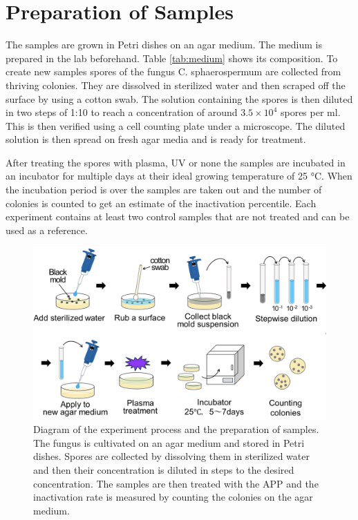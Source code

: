 \section{Preparation of Samples}
The samples are grown in Petri dishes on an agar medium. The medium is prepared in the lab beforehand. Table \ref{tab:medium} shows its composition. To create new samples spores of the fungus C. sphaerospermum are collected from thriving colonies. They are dissolved in sterilized water and then scraped off the surface by using a cotton swab. The solution containing the spores is then diluted in two steps of 1:10 to reach a concentration of around $3.5\times 10^4$ spores per ml. This is then verified using a cell counting plate under a microscope. The diluted solution is then spread on fresh agar media and is ready for treatment.

After treating the spores with plasma, UV or none the samples are incubated in an incubator for multiple days at their ideal growing temperature of 25 °C. When the incubation period is over the samples are taken out and the number of colonies is counted to get an estimate of the inactivation percentile. Each experiment contains at least two control samples that are not treated and can be used as a reference.

\begin{figure}
    \centering
    \includegraphics[width=1\textwidth]{images/Process.png}
    \caption[Diagram of the experiment process]{Diagram of the experiment process and the preparation of samples. The fungus is cultivated on an agar medium and stored in Petri dishes. Spores are collected by dissolving them in sterilized water and then their concentration is diluted in steps to the desired concentration. The samples are then treated with the APP and the inactivation rate is measured by counting the colonies on the agar medium.}
    \label{fig:process}
\end{figure}

